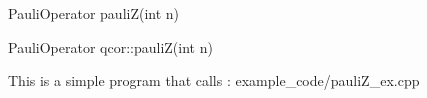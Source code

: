 
\begin{apidefinition}

\begin{Csynopsis}
    PauliOperator pauliZ(int n)
\end{Csynopsis}

\begin{Cppsynopsis}
    PauliOperator qcor::pauliZ(int n)
\end{Cppsynopsis}


\begin{apiarguments}
\end{apiarguments}



\apinotes{
    
}

\begin{apiexamples}

\apicppexample
    { This is a simple program that calls : } 
    { example_code/pauliZ_ex.cpp} 
    {}

\end{apiexamples}

\end{apidefinition}
